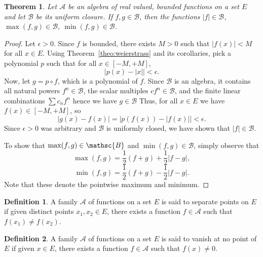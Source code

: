 \documentclass[11pt]{article}
\newtheorem{theorem}{Theorem}[section]
\theoremstyle{definition}
\newtheorem{definition}{Definition}[section]
\theoremstyle{remark}
\begin{document}
    \begin{theorem} \label{theo:abs_max_min}
        Let $\mathscr{A}$ be an algebra of real valued, bounded functions on a set
        $E$ and let $\mathscr{B}$ be its uniform closure. If $f, g\in \mathscr{B}$,
        then the functions $|f| \in \mathscr{B}$, $\max(f, g) \in \mathscr{B}$,
        $\min(f, g) \in \mathscr{B}$.
    \end{theorem}
    \begin{proof}
        Let $\epsilon > 0$.
        Since $f$ is bounded, there exists $M > 0$ such that $|f(x)| < M$ for all $x
        \in E$. Using Theorem~\ref{theo:weierstrass} and its corollaries, pick a
        polynomial $p$ such that for all $x \in [-M, +M]$, \[
            | p(x) - |x| | < \epsilon.
        \] Now, let $g = p \circ f$, which is a polynomial of $f$. Since
        $\mathscr{B}$ is an algebra, it contains all natural powers $f^n \in
        \mathscr{B}$, the scalar multiples $cf^n \in \mathscr{B}$, and the finite
        linear combinations $\sum c_nf^n$ hence we have $g \in \mathscr{B}$ Thus, for
        all $x \in E$ we have $f(x) \in [-M, +M]$, so \[
            |g(x) - f(x)| = | p(f(x)) - |f(x)| | < \epsilon.
        \] Since $\epsilon > 0$ was arbitrary and $\mathscr{B}$ is uniformly closed,
        we have shown that $|f| \in \mathscr{B}$.

        To show that $\max(f, g) \in \mathsc{B}$ and $\min(f, g) \in \mathscr{B}$,
        simply observe that \[
            \max(f, g) = \frac{1}{2}(f + g) + \frac{1}{2}|f - g|,
        \] \[
            \min(f, g) = \frac{1}{2}(f + g) - \frac{1}{2}|f - g|.
        \] Note that these denote the pointwise maximum and minimum.
    \end{proof}

    \begin{definition}
        A family $\mathscr{A}$ of functions on a set $E$ is said to separate points
        on $E$ if given distinct points $x_1, x_2 \in E$, there exists a function $f \in
        \mathscr{A}$ such that $f(x_1) \neq f(x_2)$.
    \end{definition}

    \begin{definition}
        A family $\mathscr{A}$ of functions on a set $E$ is said to vanish at no
        point of $E$ if given $x \in E$, there exists a function $f \in \mathscr{A}$
        such that $f(x) \neq 0$.
    \end{definition}
\end{document}
